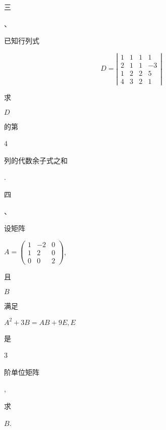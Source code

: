 \documentclass[10pt]{article}
\begin{document}
\begin{CJK}{UTF8}{mj}三\end{CJK}、\begin{CJK}{UTF8}{mj}已知行列式\end{CJK}
$$
D=\left|\begin{array}{cccc}
1 & 1 & 1 & 1 \\
2 & 1 & 1 & -3 \\
1 & 2 & 2 & 5 \\
4 & 3 & 2 & 1
\end{array}\right|
$$
\begin{CJK}{UTF8}{mj}求\end{CJK} $D$ \begin{CJK}{UTF8}{mj}的第\end{CJK} 4 \begin{CJK}{UTF8}{mj}列的代数余子式之和\end{CJK}.

\begin{CJK}{UTF8}{mj}四\end{CJK}、\begin{CJK}{UTF8}{mj}设矩阵\end{CJK} $A=\left(\begin{array}{ccc}1 & -2 & 0 \\ 1 & 2 & 0 \\ 0 & 0 & 2\end{array}\right)$, \begin{CJK}{UTF8}{mj}且\end{CJK} $B$ \begin{CJK}{UTF8}{mj}满足\end{CJK} $A^{2}+3 B=A B+9 E, E$ \begin{CJK}{UTF8}{mj}是\end{CJK} 3 \begin{CJK}{UTF8}{mj}阶单位矩阵\end{CJK}, \begin{CJK}{UTF8}{mj}求\end{CJK} $B$.
\end{document}
